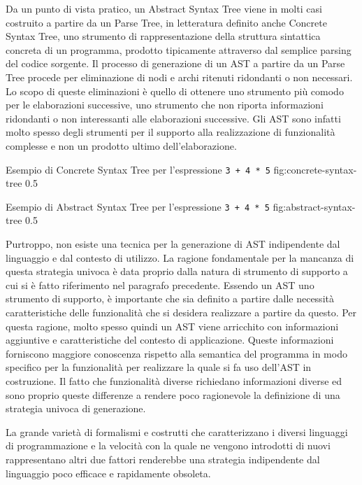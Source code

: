 Da un punto di vista pratico, un Abstract Syntax Tree viene in molti casi
costruito a partire da un Parse Tree, in letteratura definito anche Concrete
Syntax Tree, uno strumento di rappresentazione della struttura sintattica
concreta di un programma, prodotto tipicamente attraverso dal semplice parsing
del codice sorgente. Il processo di generazione di un AST a partire da un Parse
Tree procede per eliminazione di nodi e archi ritenuti ridondanti o non
necessari. Lo scopo di queste eliminazioni è quello di ottenere uno strumento
più comodo per le elaborazioni successive, uno strumento che non riporta
informazioni ridondanti o non interessanti alle elaborazioni successive. Gli
AST sono infatti molto spesso degli strumenti per il supporto alla
realizzazione di funzionalità complesse e non un prodotto ultimo
dell’elaborazione.

    {Esempio di Concrete Syntax Tree per l'espressione \texttt{3 + 4 * 5}}
      {fig:concrete-syntax-tree}
      {0.5}
      
    {Esempio di Abstract Syntax Tree per l'espressione \texttt{3 + 4 * 5}}
      {fig:abstract-syntax-tree}
      {0.5}

Purtroppo, non esiste una tecnica per la generazione di AST indipendente dal
linguaggio e dal contesto di utilizzo. La ragione fondamentale per la mancanza
di questa strategia univoca è data proprio dalla natura di strumento di
supporto a cui si è fatto riferimento nel paragrafo precedente. Essendo un AST
uno strumento di supporto, è importante che sia definito a partire dalle
necessità caratteristiche delle funzionalità che si desidera realizzare a
partire da questo. Per questa ragione, molto spesso quindi un AST viene
arricchito con informazioni aggiuntive e caratteristiche del contesto di
applicazione. Queste informazioni forniscono maggiore conoscenza rispetto alla
semantica del programma in modo specifico per la funzionalità per realizzare la
quale si fa uso dell’AST in costruzione. Il fatto che funzionalità diverse
richiedano informazioni diverse ed sono proprio queste differenze a rendere
poco ragionevole la definizione di una strategia univoca di generazione.

La grande varietà di formalismi e costrutti che caratterizzano i diversi
linguaggi di programmazione e la velocità con la quale ne vengono introdotti di
nuovi rappresentano altri due fattori renderebbe una strategia indipendente dal
linguaggio poco efficace e rapidamente obsoleta.\\


